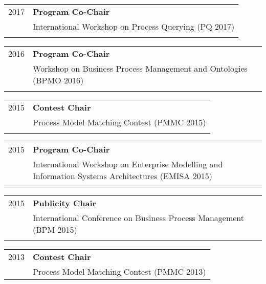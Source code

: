 \begin{tabular}{P{3cm}P{12cm}}
2017	& \textbf{Program Co-Chair}  \\
			& International Workshop on Process Querying (PQ 2017) \\
& \\		
			\end{tabular}
\begin{tabular}{P{3cm}P{12cm}}
2016	& \textbf{Program Co-Chair} \\
			& Workshop on Business Process Management and Ontologies (BPMO 2016)\\
& \\		
			\end{tabular}
\begin{tabular}{P{3cm}P{12cm}}
2015	& \textbf{Contest Chair}  \\
			& Process Model Matching Contest (PMMC 2015) \\
& \\		
			\end{tabular}
\begin{tabular}{P{3cm}P{12cm}}
2015	& \textbf{Program Co-Chair} \\
			& International Workshop on Enterprise Modelling and Information Systems Architectures (EMISA 2015)  \\
& \\			
			\end{tabular}
\begin{tabular}{P{3cm}P{12cm}}
2015	& \textbf{Publicity Chair} \\
			& International Conference on Business Process Management (BPM 2015) \\
& \\		
			\end{tabular}
\begin{tabular}{P{3cm}P{12cm}}
2013	& \textbf{Contest Chair} \\
			& Process Model Matching Contest (PMMC 2013) \\
\end{tabular}

\vspace{0.5cm}
\vspace{0.3cm}

